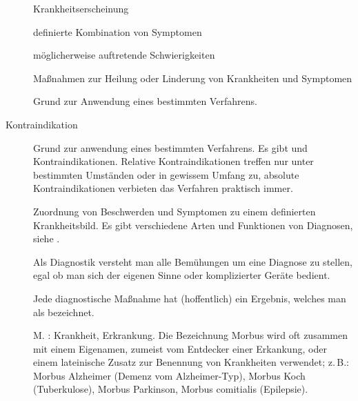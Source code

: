 {

\begin{description}
  \item[]
  Krankheitserscheinung
  
  \item[]
  definierte Kombination von Symptomen
  
  \item[]
  möglicherweise auftretende Schwierigkeiten
  \item[]  Ma{\ss}nahmen zur
  Heilung oder Linderung von Krankheiten und Symptomen
  
  \item[] Grund zur Anwendung eines bestimmten
  Verfahrens.
  \item[Kontraindikation] Grund zur \-an\-wendung
  eines bestimmten Verfahrens. Es gibt  und 
  Kontraindikationen. Relative Kontraindikationen treffen nur
  unter bestimmten Umständen oder in gewissem Umfang zu,
  absolute Kontraindikationen verbieten das Verfahren
  praktisch immer.
  \item[] Zuordnung von Beschwerden und Symptomen zu
  einem definierten Krankheitsbild. Es gibt verschiedene Arten
  und Funktionen von Diagnosen, siehe
  .
  \item[]
  
  Als Diagnostik versteht man alle Bemühungen um eine
  Diagnose zu stellen, egal ob man sich der eigenen Sinne
  oder komplizierter Geräte bedient.
  
  \item[]
  
  Jede diagnostische Maßnahme hat (hoffentlich) ein
  Ergebnis, welches man als
   bezeichnet.
  
  \item[] 
   M. : Krankheit, Erkrankung.
  Die Bezeichnung Morbus wird oft zusammen mit einem Eigenamen, 
  zumeist vom Entdecker einer Erkankung, 
  oder einem lateinische Zusatz 
  zur Benennung von Krankheiten verwendet; z.\,B.: 
  Morbus Alzheimer (Demenz vom Alzheimer-Typ), 
  Morbus Koch (Tuberkulose), 
  Morbus Parkinson, 
  Morbus comitialis (Epilepsie).
\end{description}
}
{}
{}
{}
{}




